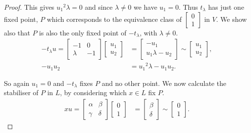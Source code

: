 \documentclass[a4paper , 11pt]{book}
\theoremstyle{definition}
\theoremstyle{remark}
\begin{document}
\begin{proof}
This gives ${u_1}^2 \lambda = 0$ and since $\lambda \neq 0$ we have $u_1 = 0$. Thus $t_\lambda$ has just one fixed point, $P$ which corresponds to the equivalence class of $\begin{bmatrix} 0 \\ 1 \end{bmatrix}$ in $V$. We show also that $P$ is also the only fixed point of $-t_\lambda$, with $\lambda \neq 0$.
\begin{align*} -t_\lambda u = \begin{bmatrix} -1 & 0 \\ \lambda & -1 \end{bmatrix} \begin{bmatrix} u_1 \\ u_2 \end{bmatrix} &= \begin{bmatrix} -u_1 \\ u_1 \lambda - u_2 \end{bmatrix} \sim \begin{bmatrix} u_1 \\ u_2 \end{bmatrix}, 
\\[1.5ex] -u_1 u_2 &= {u_1}^2 \lambda - u_1 u_2.
\end{align*}

So again $u_1 =0$ and $-t_\lambda$ fixes $P$ and no other point. We now calculate the stabiliser of $P$ in $L$, by considering which $x \in L$ fix $P$. \\
\begin{align*} x u = \begin{bmatrix} \alpha & \beta \\ \gamma & \delta \end{bmatrix} \begin{bmatrix} 0 \\ 1 \end{bmatrix} &= \begin{bmatrix} \beta \\ \delta \end{bmatrix} \sim \begin{bmatrix} 0 \\ 1 \end{bmatrix}.
\end{align*}


\end{proof}
\end{document}
